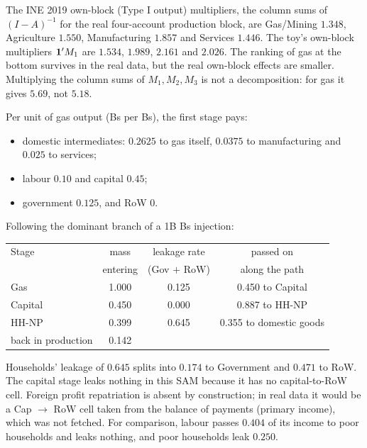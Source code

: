 \documentclass[../solutions_manual.tex]{subfiles}
\begin{document}
 The INE 2019 own-block (Type I output) multipliers, the column sums of $(I - A)^{-1}$ for the real four-account production block, are Gas/Mining $1.348$, Agriculture $1.550$, Manufacturing $1.857$ and Services $1.446$. The toy's own-block multipliers $\mathbf{1}'M_1$ are $1.534$, $1.989$, $2.161$ and $2.026$. The ranking of gas at the bottom survives in the real data, but the real own-block effects are smaller. Multiplying the column sums of $M_1, M_2, M_3$ is not a decomposition: for gas it gives $5.69$, not $5.18$.


 Per unit of gas output (Bs per Bs), the first stage pays:
\begin{itemize}
\item domestic intermediates: $0.2625$ to gas itself, $0.0375$ to manufacturing and $0.025$ to services;
\item labour $0.10$ and capital $0.45$;
\item government $0.125$, and RoW $0$.
\end{itemize}
Following the dominant branch of a 1B Bs injection:
\begin{center}\small
\begin{tabular}{lccc}
\toprule
Stage & mass & leakage rate & passed on \\
& entering & (Gov $+$ RoW) & along the path \\
\midrule
Gas & 1.000 & 0.125 & 0.450 to Capital \\
Capital & 0.450 & 0.000 & 0.887 to HH-NP \\
HH-NP & 0.399 & 0.645 & 0.355 to domestic goods \\
back in production & 0.142 & & \\
\bottomrule
\end{tabular}
\end{center}
Households' leakage of $0.645$ splits into $0.174$ to Government and $0.471$ to RoW. The capital stage leaks nothing in this SAM because it has no capital-to-RoW cell. Foreign profit repatriation is absent by construction; in real data it would be a Cap $\to$ RoW cell taken from the balance of payments (primary income), which was not fetched. For comparison, labour passes $0.404$ of its income to poor households and leaks nothing, and poor households leak $0.250$.
\end{document}
